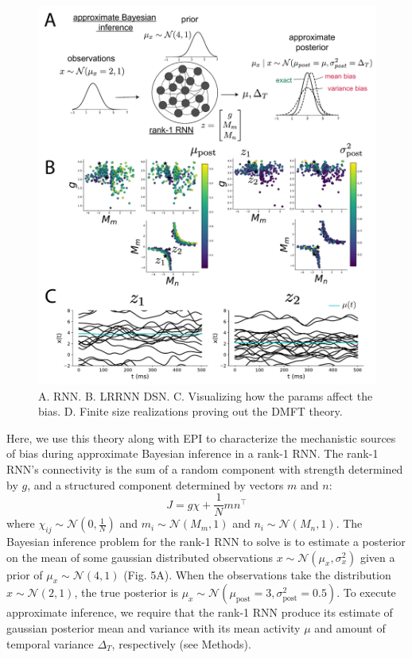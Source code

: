 \documentclass[11pt]{article}
\begin{document}
\begin{figure}
\begin{center}
\includegraphics[scale=0.6]{figs/fig5/fig5.pdf}
\end{center}
\caption{A. RNN. B. LRRNN DSN.  C. Visualizing how the params affect the bias.  D. Finite size realizations proving out the DMFT theory.}
\end{figure}

Here, we use this theory along with EPI to characterize the mechanistic sources of bias during approximate Bayesian inference in a rank-1 RNN. The rank-1 RNN's connectivity is the sum of a random component with strength determined by $g$, and a structured component determined by vectors $m$ and $n$:
\begin{equation}
J = g\chi + \frac{1}{N}mn^\top
\end{equation}
where $\chi_{ij} \sim \mathcal{N}(0, \frac{1}{N})$ and $m_i \sim \mathcal{N}(M_m, 1)$ and $n_i \sim \mathcal{N}(M_n, 1)$.  The Bayesian inference problem for the rank-1 RNN to solve is to estimate a posterior on the mean of some gaussian distributed observations $x \sim \mathcal{N}(\mu_x, \sigma_x^2)$ given a prior of $\mu_x \sim \mathcal{N}(4, 1)$ (Fig. 5A).  When the observations take the distribution $x \sim \mathcal{N}(2, 1)$, the true posterior is $\mu_x \sim \mathcal{N}(\mu_{\text{post}}=3, \sigma^2_{\text{post}}=0.5)$.  To execute approximate inference, we require that the rank-1 RNN produce its estimate of gaussian posterior mean and variance with its mean activity $\mu$ and amount of temporal variance $\Delta_T$, respectively (see Methods).
\end{document}
